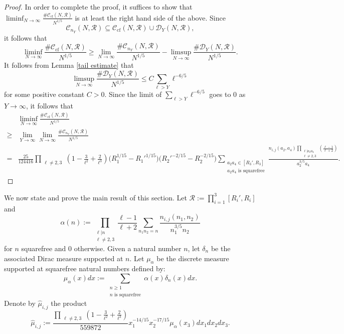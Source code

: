 \documentclass[table]{amsart}
\newcommand{\op}[1]{\operatorname{#1}}
\numberwithin{equation}{section}
\begin{document}
\begin{proof}
    In order to complete the proof, it suffices to show that $\liminf_{N\rightarrow \infty} \frac{\# \mathcal{C}_{\op{cf}}(N,\mathscr{R})}{N^{1/5}}$ is at least the right hand side of the above. Since 
    \[\mathcal{C}_{n_Y}(N,\mathscr{R})\subseteq \mathcal{C}_{\op{cf}}(N,\mathscr{R})\cup \mathcal{D}_Y(N,\mathscr{R}),\] it follows that 
    \[\liminf_{N\rightarrow \infty} \frac{\# \mathcal{C}_{\op{cf}}(N,\mathscr{R})}{N^{1/5}}\geq \lim_{N\rightarrow\infty} \frac{\# \mathcal{C}_{n_Y}(N,\mathscr{R})}{N^{1/5}}-\limsup_{N\rightarrow\infty} \frac{\# \mathcal{D}_Y(N,\mathscr{R})}{N^{1/5}}.\]
    It follows from Lemma \ref{tail estimate} that
    \[\limsup_{N\rightarrow\infty} \frac{\# \mathcal{D}_Y(N,\mathscr{R})}{N^{1/5}}\leq C \sum_{\ell>Y} \ell^{-6/5}\] for some positive constant $C>0$. Since the limit of $\sum_{\ell>Y} \ell^{-6/5}$ goes to $0$ as $Y\rightarrow \infty$, it follows that 
    \[\begin{split}&\liminf_{N\rightarrow \infty} \frac{\# \mathcal{C}_{\op{cf}}(N,\mathscr{R})}{N^{1/5}}\\
    \geq&\lim_{Y\rightarrow \infty} \lim_{N\rightarrow\infty} \frac{\# \mathcal{C}_{n_Y}(N,\mathscr{R})}{N^{1/5}}\\
    =& \frac{25}{124416}\prod_{\substack{\ell\neq 2,3}}\left(1-\frac{3}{\ell^2}+\frac{2}{\ell^3}\right)
\bigl(R_1^{1/15}-R_1'^{1/15}\bigr)
\bigl(R_2'^{-2/15}-R_2^{-2/15}\bigr) \sum_{\substack{a_2a_4\in [R_3', R_3]\\
    a_2a_4\text{ is squarefree}}}\frac{n_{i,j}(a_2,a_4)\prod_{\substack{\ell|a_2a_4\\ \ell\neq 2,3}}\left(\frac{\ell-1}{\ell+2}\right)}{a_2^{3/5} a_4}.\end{split}\]
\end{proof}
We now state and prove the main result of this section. Let $\mathscr{R}:=\prod_{i=1}^3 [R_i', R_i]$ and \[\alpha(n):=\prod_{\substack{\ell|n\\\ell\neq 2,3}} \frac{\ell-1}{\ell+2} \sum_{n_1 n_2=n} \frac{n_{i,j}(n_1, n_2)}{n_1^{3/5}n_2}\] for $n$ squarefree and $0$ otherwise. Given a natural number $n$, let $\delta_n$ be the associated Dirac measure supported at $n$. Let $\mu_\alpha$ be the discrete measure supported at squarefree natural numbers defined by:
\[\mu_\alpha(x)dx:=\sum_{\substack{n\geq 1\\ n\text{ is squarefree}}}\alpha(x)\delta_n(x)dx.\]
Denote by $\hat{\mu}_{i,j}$ the product 
\begin{equation}\label{mu i,j defn}\hat{\mu}_{i,j}:=\frac{\prod_{\substack{\ell\neq 2,3}}\left(1-\frac{3}{\ell^2}+\frac{2}{\ell^3}\right)}{559872}x_1^{-14/15}x_2^{-17/15}\mu_\alpha(x_3) dx_1dx_2dx_3.\end{equation}
\end{document}
